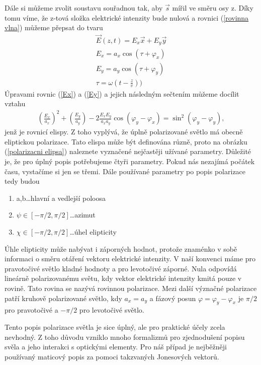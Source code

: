 Dále si můžeme zvolit soustavu souřadnou tak, aby $\vec{s}$ mířil ve směru osy z. Díky tomu víme, že z-tová složka elektrické intenzity bude nulová a rovnici (\ref{rovinna vlna}) můžeme  přepsat do tvaru
\begin{eqnarray}
\vec{E}(z,t)=E_x\vec{x}+E_y\vec{y} \\
E_x=a_x\cos(\tau+\varphi_x) \label{Ex}\\
E_y=a_y\cos(\tau+\varphi_y) \label{Ey}\\
\tau=\omega(t-\frac{z}{v}))
\end{eqnarray}
Úpravami rovnic (\ref{Ex}) a (\ref{Ey}) a jejich následným sečtením můžeme docílit vztahu
\begin{eqnarray}
\left(\frac{E_x}{a_x}\right)^2+\left(\frac{E_y}{a_y}\right)-2\frac{E_xE_y}{a_xa_y}\cos(\varphi_y-\varphi_x)=\sin^2(\varphi_y-\varphi_y),
\end{eqnarray}
jenž je rovnicí elispy. Z toho vyplývá, že úplně polarizované světlo má obecně eliptickou polarizace. Tato elispa může být definována různě, proto na obrázku (\ref{polarizacni elipsa}) naleznete vyznačené nejčastěji užívané parametry. Důležité je, že pro úplný popis potřebujeme čtyři parametry. Pokud nás nezajímá počátek času, vystačíme si jen se třemi. Dále používané parametry po popis polarizace tedy budou
\begin{enumerate}
\item a,b\dots hlavní a vedlejší poloosa
\item $\psi\in[-\pi/2,\pi/2]$\dots azimut
\item $\chi\in[-\pi/2,\pi/2]$\dots úhel elipticity
\end{enumerate}
Úhle elipticity může nabývat i záporných hodnot, protože znaménko v sobě informaci o směru otáření vektoru elektrické intenzity. V naší konvenci máme pro pravotočivé světlo kladné hodnoty a pro levotočivé záporné. Nula odpovídá lineárně polarizovanému světu, kdy vektor elektrické intenzity kmitá pouze v rovině. Tato rovina se nazývá rovinnou polarizace. Mezi další význačné polarizace patří kruhově polarizované světlo, kdy $a_x=a_y$ a fázový posun $\varphi=\varphi_y-\varphi_x$ je $\pi/2$ pro pravotočivé a $-\pi/2$ pro levotočivé světlo.

Tento popis polarizace světla je sice úplný, ale pro praktické účely zcela nevhodný. Z toho důvodu vzniklo mnoho formalizmů pro zjednodušení popisu svěla a jeho interakci s optickými elementy. Pro náš případ je nejběžněji používaný maticový popis za pomoci takzvaných Jonesových vektorů.

